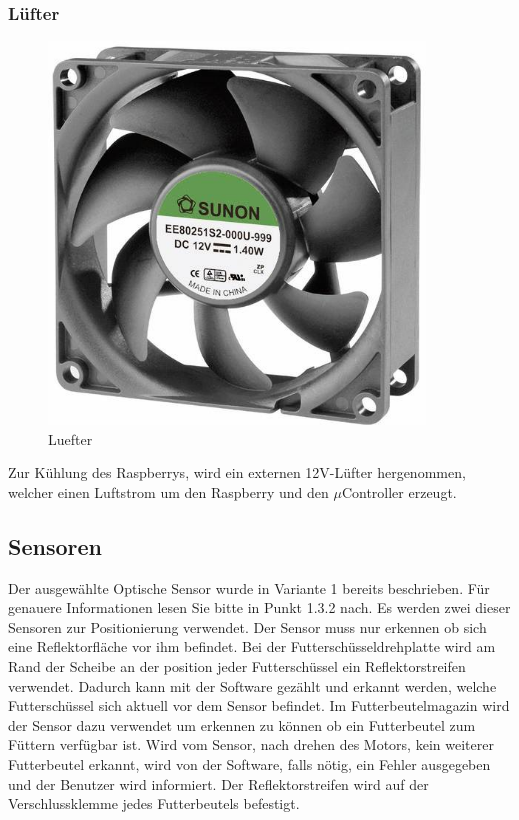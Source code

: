 \subsubsection{Lüfter}
\begin{figure}[H] 
\begin{center}

\includegraphics[width=10cm]{Bilder/Bauteile/Luefter}
\caption{Luefter}
\label{Luefter}

\end{center}
\end{figure}
Zur Kühlung des Raspberrys, wird ein externen 12V-Lüfter hergenommen, welcher einen Luftstrom um den Raspberry und den $\mu$Controller erzeugt.
\subsection{Sensoren}
Der ausgewählte Optische Sensor wurde in Variante 1 bereits beschrieben. Für genauere Informationen lesen Sie bitte in Punkt 1.3.2 nach.
Es werden zwei dieser Sensoren zur Positionierung verwendet. Der Sensor muss nur erkennen ob sich eine Reflektorfläche vor ihm befindet. Bei der Futterschüsseldrehplatte wird am Rand der Scheibe an der position jeder Futterschüssel ein Reflektorstreifen verwendet. Dadurch kann mit der Software gezählt und erkannt werden, welche Futterschüssel sich aktuell vor dem Sensor befindet. Im Futterbeutelmagazin wird der Sensor dazu verwendet um erkennen zu können ob ein Futterbeutel zum Füttern verfügbar ist. Wird vom Sensor, nach drehen des Motors, kein weiterer Futterbeutel erkannt, wird von der Software, falls nötig, ein Fehler ausgegeben und der Benutzer wird informiert. Der Reflektorstreifen wird auf der Verschlussklemme jedes Futterbeutels befestigt.
